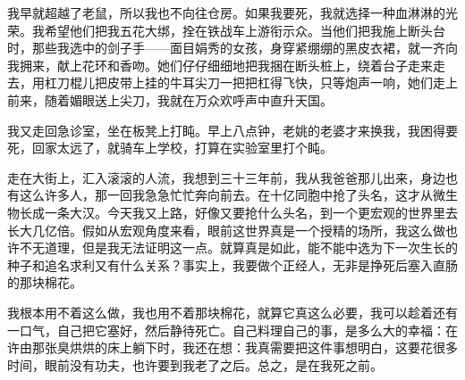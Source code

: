  我早就超越了老鼠，所以我也不向往仓房。如果我要死，我就选择一种血淋淋的光荣。我希望他们把我五花大绑，拴在铁战车上游衔示众。当他们把我施上断头台时，那些我选中的剑子手——面目娟秀的女孩，身穿紧绷绷的黑皮衣裙，就一齐向我拥来，献上花环和香吻。她们仔仔细细地把我捆在断头桩上，绕着台子走来走去，用杠刀棍儿把皮带上挂的牛耳尖刀一把把杠得飞快，只等炮声一响，她们走上前来，随着媚眼送上尖刀，我就在万众欢呼声中直升天国。 
 
 我又走回急诊室，坐在板凳上打盹。早上八点钟，老姚的老婆才来换我，我困得要死，回家太远了，就骑车上学校，打算在实验室里打个盹。 
 
 走在大街上，汇入滚滚的人流，我想到三十三年前，我从我爸爸那儿出来，身边也有这么许多人，那一回我急急忙忙奔向前去。在十亿同胞中抢了头名，这才从微生物长成一条大汉。今天我又上路，好像又要抢什么头名，到一个更宏观的世界里去长大几亿倍。假如从宏观角度来看，眼前这世界真是一个授精的场所，我这么做也许不无道理，但是我无法证明这一点。就算真是如此，能不能中选为下一次生长的种子和追名求利又有什么关系？事实上，我要做个正经人，无非是挣死后塞入直肠的那块棉花。 
 
 我根本用不着这么做，我也用不着那块棉花，就算它真这么必要，我可以趁着还有一口气，自己把它塞好，然后静待死亡。自己料理自己的事，是多么大的幸福：在许由那张臭烘烘的床上躺下时，我还在想：我真需要把这件事想明白，这要花很多时间，眼前没有功夫，也许要到我老了之后。总之，是在我死之前。

